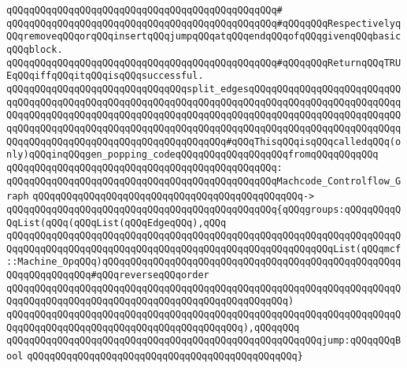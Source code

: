\verb|qQQqqQQqqQQqqQQqqQQqqQQqqQQqqQQqqQQqqQQqqQQqqQQq#|\newline
\verb|qQQqqQQqqQQqqQQqqQQqqQQqqQQqqQQqqQQqqQQqqQQqqQQq#qQQqqQQqRespectivelyqQQqremoveqQQqorqQQqinsertqQQqjumpqQQqatqQQqendqQQqofqQQqgivenqQQqbasicqQQqblock.|\newline
\verb|qQQqqQQqqQQqqQQqqQQqqQQqqQQqqQQqqQQqqQQqqQQqqQQq#qQQqqQQqReturnqQQqTRUEqQQqiffqQQqitqQQqisqQQqsuccessful.|\newline
\newline
\newline
\verb|qQQqqQQqqQQqqQQqqQQqqQQqqQQqqQQqsplit_edgesqQQqqQQqqQQqqQQqqQQqqQQqqQQqqQQqqQQqqQQqqQQqqQQqqQQqqQQqqQQqqQQqqQQqqQQqqQQqqQQqqQQqqQQqqQQqqQQqqQQqqQQqqQQqqQQqqQQqqQQqqQQqqQQqqQQqqQQqqQQqqQQqqQQqqQQqqQQqqQQqqQQqqQQqqQQqqQQqqQQqqQQqqQQqqQQqqQQqqQQqqQQqqQQqqQQqqQQqqQQqqQQqqQQqqQQqqQQqqQQqqQQqqQQqqQQqqQQqqQQqqQQqqQQqqQQqqQQq#qQQqThisqQQqisqQQqcalledqQQq(only)qQQqinqQQqgen_popping_codeqQQqqQQqqQQqqQQqqQQqfromqQQqqQQqqQQq|\newline
\verb|qQQqqQQqqQQqqQQqqQQqqQQqqQQqqQQqqQQqqQQqqQQqqQQq:|\newline
\verb|qQQqqQQqqQQqqQQqqQQqqQQqqQQqqQQqqQQqqQQqqQQqqQQqMachcode_Controlflow_Graph|\newline
\verb|qQQqqQQqqQQqqQQqqQQqqQQqqQQqqQQqqQQqqQQqqQQqqQQq->|\newline
\verb|qQQqqQQqqQQqqQQqqQQqqQQqqQQqqQQqqQQqqQQqqQQqqQQq{qQQqgroups:qQQqqQQqqQQqList(qQQq(qQQqList(qQQqEdgeqQQq),qQQq|\newline
\verb|qQQqqQQqqQQqqQQqqQQqqQQqqQQqqQQqqQQqqQQqqQQqqQQqqQQqqQQqqQQqqQQqqQQqqQQqqQQqqQQqqQQqqQQqqQQqqQQqqQQqqQQqqQQqqQQqqQQqqQQqqQQqqQQqList(qQQqmcf::Machine_OpqQQq)qQQqqQQqqQQqqQQqqQQqqQQqqQQqqQQqqQQqqQQqqQQqqQQqqQQqqQQqqQQqqQQqqQQq#qQQqreverseqQQqorder|\newline
\verb|qQQqqQQqqQQqqQQqqQQqqQQqqQQqqQQqqQQqqQQqqQQqqQQqqQQqqQQqqQQqqQQqqQQqqQQqqQQqqQQqqQQqqQQqqQQqqQQqqQQqqQQqqQQqqQQqqQQqqQQq)|\newline
\verb|qQQqqQQqqQQqqQQqqQQqqQQqqQQqqQQqqQQqqQQqqQQqqQQqqQQqqQQqqQQqqQQqqQQqqQQqqQQqqQQqqQQqqQQqqQQqqQQqqQQqqQQqqQQqqQQq),qQQqqQQq|\newline
\verb|qQQqqQQqqQQqqQQqqQQqqQQqqQQqqQQqqQQqqQQqqQQqqQQqqQQqqQQqjump:qQQqqQQqBool|\newline
\verb|qQQqqQQqqQQqqQQqqQQqqQQqqQQqqQQqqQQqqQQqqQQqqQQq}|\newline
